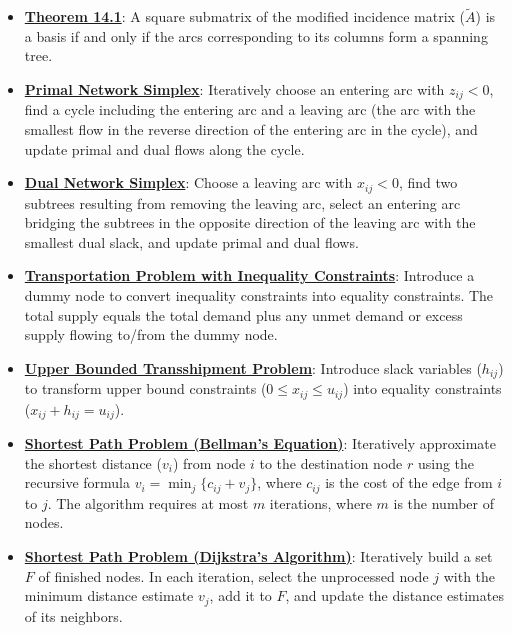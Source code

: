 \documentclass{article}%
\begin{document}
\begin{itemize}[leftmargin=*]
\item \href{https://www.math.purdue.edu/~yipn/421/2024-11-05-NetFlows.pdf#page=15}{\textbf{Theorem 14.1}}: A square submatrix of the modified incidence matrix ($\tilde{A}$) is a basis if and only if the arcs corresponding to its columns form a spanning tree.%
\item \href{https://www.math.purdue.edu/~yipn/421/2024-11-07-NetSimplex.pdf#page=5}{\textbf{Primal Network Simplex}}: Iteratively choose an entering arc with $z_{ij} < 0$, find a cycle including the entering arc and a leaving arc (the arc with the smallest flow in the reverse direction of the entering arc in the cycle), and update primal and dual flows along the cycle. %
\item \href{https://www.math.purdue.edu/~yipn/421/2024-11-07-NetSimplex.pdf#page=32}{\textbf{Dual Network Simplex}}: Choose a leaving arc with $x_{ij} < 0$, find two subtrees resulting from removing the leaving arc, select an entering arc bridging the subtrees in the opposite direction of the leaving arc with the smallest dual slack, and update primal and dual flows. %
\item \href{https://www.math.purdue.edu/~yipn/421/2024-11-14-NetAppls.pdf#page=3}{\textbf{Transportation Problem with Inequality Constraints}}: Introduce a dummy node to convert inequality constraints into equality constraints. The total supply equals the total demand plus any unmet demand or excess supply flowing to/from the dummy node. %
\item \href{https://www.math.purdue.edu/~yipn/421/2024-11-14-NetAppls.pdf#page=9}{\textbf{Upper Bounded Transshipment Problem}}: Introduce slack variables ($h_{ij}$) to transform upper bound constraints ($0 \le x_{ij} \le u_{ij}$) into equality constraints ($x_{ij} + h_{ij} = u_{ij}$). %
\item \href{https://www.math.purdue.edu/~yipn/421/2024-11-14-NetAppls.pdf#page=17}{\textbf{Shortest Path Problem (Bellman's Equation)}}: Iteratively approximate the shortest distance ($v_i$) from node $i$ to the destination node $r$ using the recursive formula $v_i = \min_{j} \{c_{ij} + v_j\}$, where $c_{ij}$ is the cost of the edge from $i$ to $j$. The algorithm requires at most $m$ iterations, where $m$ is the number of nodes. %
\item \href{https://www.math.purdue.edu/~yipn/421/2024-11-14-NetAppls.pdf#page=21}{\textbf{Shortest Path Problem (Dijkstra's Algorithm)}}: Iteratively build a set $F$ of finished nodes. In each iteration, select the unprocessed node $j$ with the minimum distance estimate $v_j$, add it to $F$, and update the distance estimates of its neighbors. %

\end{itemize}
\end{document}
